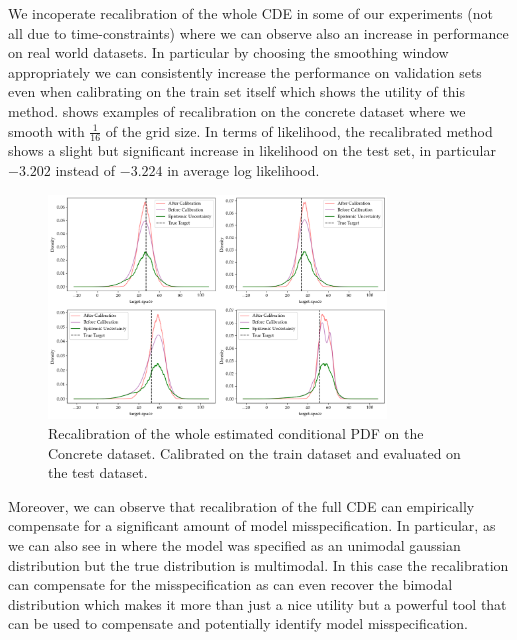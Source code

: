 We incoperate recalibration of the whole CDE in some of our experiments (not all due to time-constraints) where we can observe also an increase in performance on real world datasets. In particular by choosing the smoothing window appropriately we can consistently increase the performance on validation sets even when calibrating on the train set itself which shows the utility of this method.  shows examples of recalibration on the concrete dataset where we smooth with $\frac{1}{16}$ of the grid size. In terms of likelihood, the recalibrated method shows a slight but significant increase in likelihood on the test set, in particular $-3.202$ instead of $-3.224$ in average log likelihood. %

\begin{figure}
    \centering
    \includegraphics[width=0.8\textwidth]{resources/recalibration_concrete_dataset.png}
    \caption{Recalibration of the whole estimated conditional PDF on the Concrete dataset. Calibrated on the train dataset and evaluated on the test dataset.}
    \label{fig:recalibration_concrete}
\end{figure}

Moreover, we can observe that recalibration of the full CDE can empirically compensate for a significant amount of model misspecification. In particular, as we can also see in  where the model was specified as an unimodal gaussian distribution but the true distribution is multimodal. In this case the recalibration can compensate for the misspecification as can even recover the bimodal distribution which makes it more than just a nice utility but a powerful tool that can be used to compensate and potentially identify model misspecification.


